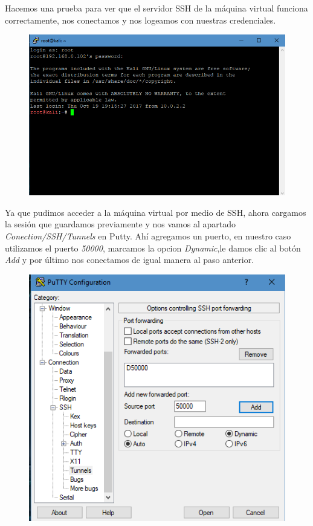 \documentclass{article}
\begin{document}
Hacemos una prueba para ver que el servidor SSH de la m\'aquina virtual funciona correctamente, nos conectamos y nos logeamos con nuestras credenciales.

\begin{figure}[H]
\centering
\includegraphics[width=1\textwidth]{09-LOGEADOSSH}
\end{figure}

Ya que pudimos acceder a la m\'aquina virtual por medio de SSH, ahora cargamos la sesi\'on que guardamos previamente y nos vamos al apartado \emph{Conection/SSH/Tunnels} en Putty. Ah\'i agregamos un puerto, en nuestro caso utilizamos el puerto \emph{50000}, marcamos la opcion \emph{Dynamic},le damos clic al bot\'on \emph{Add} y por \'ultimo nos conectamos de igual manera al paso anterior.

\begin{figure}[H]
\centering
\includegraphics[width=1\textwidth]{10-PUERTO50000}
\end{figure}
\end{document}
